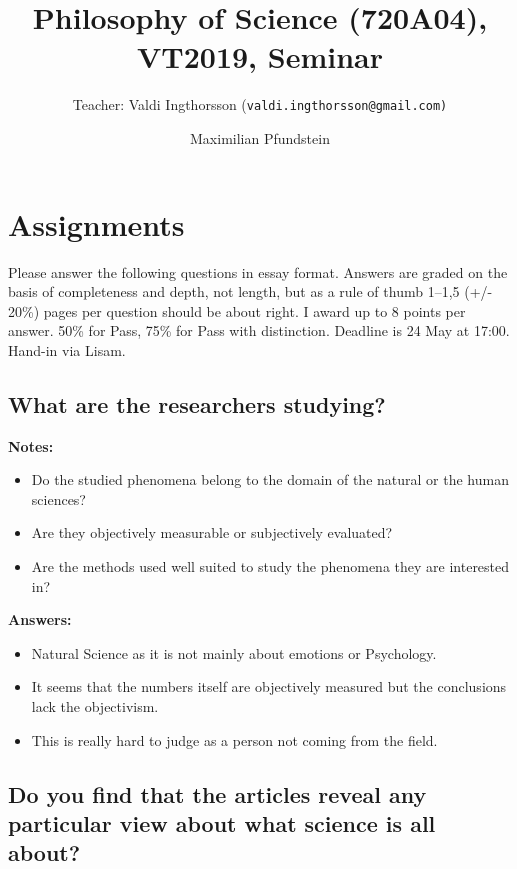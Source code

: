\documentclass[11pt]{scrartcl}
\title{Philosophy of Science (720A04), VT2019, Seminar}
\subtitle{Teacher: Valdi Ingthorsson (\texttt{valdi.ingthorsson@gmail.com)}}
\author{Maximilian Pfundstein}
\begin{document}
\maketitle

\tableofcontents

\newpage

\section{Assignments}

Please answer the following questions in essay format. Answers are graded on the basis of completeness and depth, not length, but as a rule of thumb 1–1,5 (+/- 20\%) pages per question should be about right. I award up to 8 points per answer. 50\% for Pass, 75\% for Pass with distinction. Deadline is 24 May at 17:00. Hand-in via Lisam.

\subsection{What are the researchers studying?}

\textbf{Notes:}
\begin{itemize}
  \item Do the studied phenomena belong to the domain of the natural or the human sciences?
  \item Are they objectively measurable or subjectively evaluated?
  \item Are the methods used well suited to study the phenomena they are interested in?
\end{itemize}

\textbf{Answers:}
\begin{itemize}
  \item Natural Science as it is not mainly about emotions or Psychology.
  \item It seems that the numbers itself are objectively measured but the conclusions lack the objectivism.
  \item This is really hard to judge as a person not coming from the field.
\end{itemize}

\bigbreak

\subsection{Do you find that the articles reveal any particular view about what science is all about?}
\end{document}
